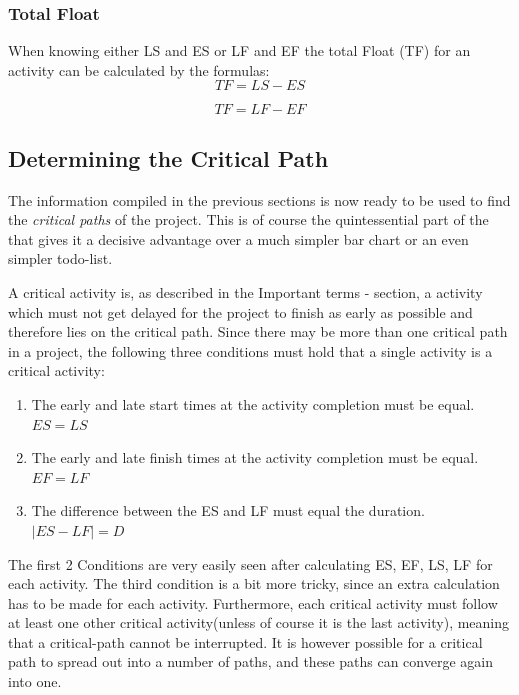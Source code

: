 \subsubsection{Total Float}
 
 When knowing either LS and ES  or LF and EF the total Float (TF) for an activity can be calculated by the formulas:
\begin{equation}
	TF = LS - ES
\end{equation}	

\begin{equation}
TF = LF - EF
\end{equation} 




\subsection{Determining the Critical Path} \label{determine_crit_path}
The information compiled in the previous sections is now ready to be used to find the \emph{critical
paths} of the project. This is of course the quintessential part of the \cpm{} that gives it a
decisive advantage over a much simpler bar chart or an even simpler todo-list.

A critical activity is, as described in the Important terms - section, a activity which must not get delayed for the project to finish as early as possible and therefore lies on the critical path. Since there may be more than one critical path in a project, the following three conditions must hold that a single activity is a critical activity:

\begin{enumerate}
	\item The early and late start times at the activity completion must be equal. $ ES = LS $
	\item The early and late finish times at the activity completion must be equal. $ EF = LF $
	\item The difference between the ES and LF must equal the duration. $ |ES - LF| = D $
\end{enumerate}

The first 2 Conditions are very easily seen after calculating ES, EF, LS, LF for each activity. The third condition is a bit more tricky, since an extra calculation has to be made for each activity.
Furthermore, each critical activity must follow at least one other critical activity(unless of course it is the last activity), meaning that a critical-path cannot be interrupted. It is however possible for a critical path to spread out into a number of paths, and these paths can converge again into one.



